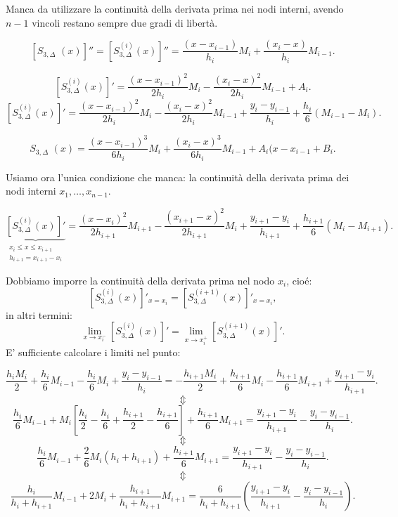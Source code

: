 Manca da utilizzare la continuità della derivata prima nei nodi interni, 
avendo $n-1$ vincoli restano sempre due gradi di libertà.

\[
\left[S_{3,\Delta}^{\phantom{(1)}}(x) \right]'' = 
\left[S_{3,\Delta}^{(i)}(x) \right]''
= \frac{(x-x_{i-1})}{h_i}M_i + \frac{(x_i-x)}{h_i}M_{i-1}.
\]

\[
\left[S_{3,\Delta}^{(i)}(x) \right]' = \frac{(x-x_{i-1})^2}{2h_i}M_i 
- \frac{(x_i-x)^2}{2h_i}M_{i-1} +A_i.
\]
\[
\left[S_{3,\Delta}^{(i)}(x) \right]' = \frac{(x-x_{i-1})^2}{2h_i}M_i 
- \frac{(x_i-x)^2}{2h_i}M_{i-1} + \frac{y_{i} -y_{i-1}}{h_i} + 
\frac{h_i}{6}\left(M_{i-1}-M_i\right).
\]

\[
S_{3,\Delta}^{\phantom{(1)}}(x) = \frac{(x-x_{i-1})^3}{6h_i}M_i +
\frac{(x_i-x)^3}{6h_i}M_{i-1} + A_i(x-x_{i-1} + B_i.
\]

Usiamo ora l'unica condizione che manca: la continuità della derivata prima
dei nodi interni $x_1, \ldots, x_{n-1}$.

\[
\underbrace{\left[S_{3,\Delta}^{(i)}(x) \right]'}_{\substack{x_i \leq x \leq  x_{i+1} \\ 
h_{i+1} = x_{i+1}-x_i}} = \frac{(x-x_{i})^2}{2h_{i+1}}M_{i+1} 
- \frac{(x_{i+1}-x)^2}{2h_{i+1}}M_{i} + \frac{y_{i+1} -y_{i}}{h_{i+1}} + 
\frac{h_{i+1}}{6}\left(M_{i}-M_{i+1}\right).
\]

Dobbiamo imporre la continuità della derivata prima nel nodo $x_i$, cioé:
\[
\left[S_{3,\Delta}^{(i)}(x) \right]'_{x = x_i} = \left[S_{3,\Delta}^{(i+1)}(x) 
\right]'_{x=x_i},
\]
in altri termini:
\[
\lim_{x \to x_i^-} \left[S_{3,\Delta}^{(i)}(x) \right]' =
\lim_{x \to x_i^+} \left[S_{3,\Delta}^{(i+1)}(x) \right]'.
\]
E' sufficiente calcolare i limiti nel punto:

\[
\frac{h_iM_i}{2} + \frac{h_{i}}{6}M_{i-1} - \frac{h_{i}}{6}M_{i} +
\frac{y_{i} -y_{i-1}}{h_i} = -
\frac{h_{i+1}M_i}{2} + \frac{h_{i+1}}{6}M_{i} - \frac{h_{i+1}}{6}M_{i+1} +
\frac{y_{i+1} -y_{i}}{h_{i+1}}.
\]
\[\Updownarrow\]
\[
\frac{h_{i}}{6}M_{i-1} + M_i\left[\frac{h_i}{2} - \frac{h_{i}}{6} +
\frac{h_{i+1}}{2}  - \frac{h_{i+1}}{6}\right] + \frac{h_{i+1}}{6}M_{i+1} =
\frac{y_{i+1} -y_{i}}{h_{i+1}} - \frac{y_{i} -y_{i-1}}{h_{i}}.
\]
\[\Updownarrow\]
\[
\frac{h_{i}}{6}M_{i-1} + \frac{2}{6}M_i(h_i+h_{i+1}) + \frac{h_{i+1}}{6}M_{i+1} =
\frac{y_{i+1} -y_{i}}{h_{i+1}} - \frac{y_{i} -y_{i-1}}{h_{i}}.
\]
\[\Updownarrow\]
\[
\frac{h_{i}}{h_{i}+h_{i+1}}M_{i-1} + 2M_i + \frac{h_{i+1}}{h_{i}+h_{i+1}}M_{i+1} =
\frac{6}{h_{i}+h_{i+1}}\left(\frac{y_{i+1} -y_{i}}{h_{i+1}} - 
\frac{y_{i} -y_{i-1}}{h_{i}}\right).
\]

